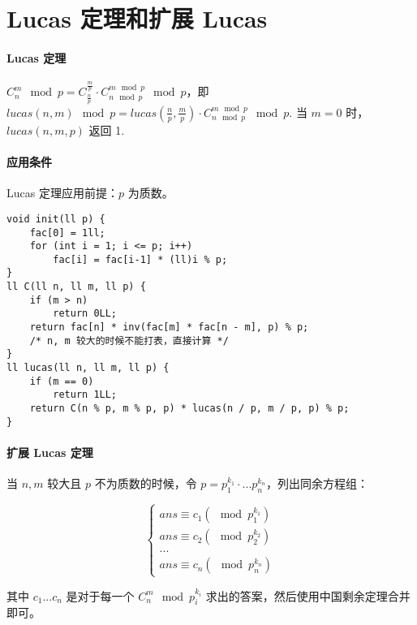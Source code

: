 \section{Lucas 定理和扩展 Lucas}

\paragraph{Lucas 定理} $C_n^m \mod p = C_{\frac{n}{p}}^\frac{m}{p} \cdot C_{n \mod p}^{m \mod p} \mod p$，即 $lucas(n, m) \mod p = lucas(\frac{n}{p}, \frac{m}{p}) \cdot C_{n \mod p}^{m \mod p} \mod p$. 当 $m = 0$ 时，$lucas(n, m, p)$ 返回 1.

\paragraph{应用条件} Lucas 定理应用前提：$p$ 为质数。

\begin{verbatim}
void init(ll p) {
    fac[0] = 1ll;
    for (int i = 1; i <= p; i++)
        fac[i] = fac[i-1] * (ll)i % p;
}
ll C(ll n, ll m, ll p) { 
    if (m > n)
        return 0LL;
    return fac[n] * inv(fac[m] * fac[n - m], p) % p;
    /* n, m 较大的时候不能打表，直接计算 */
}
ll lucas(ll n, ll m, ll p) {
    if (m == 0)
        return 1LL;
    return C(n % p, m % p, p) * lucas(n / p, m / p, p) % p;
}
\end{verbatim}

\paragraph{扩展 Lucas 定理} 当 $n, m$ 较大且 $p$ 不为质数的时候，令 $p = p_1^{k_1} \cdot ... p_n^{k_n}$，列出同余方程组：

$$\begin{cases}ans \equiv c_1 (\mod p_1^{k_1}) \\ ans \equiv c_2 (\mod p_2^{k_2}) \\ ... \\ ans \equiv c_n (\mod p_n^{k_n})\end{cases}$$

其中 $c_1 ... c_n$ 是对于每一个 $C_n^m \mod p_i^{k_i}$ 求出的答案，然后使用中国剩余定理合并即可。
